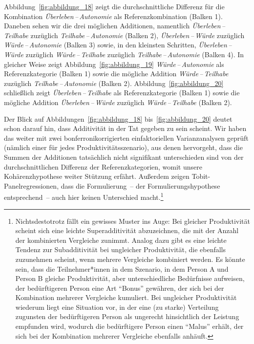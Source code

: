 \documentclass[justified,nobib,symmetric,twoside]{tufte-handout}
\begin{document}
Abbildung~\ref{fig:abbildung_18} zeigt die durchschnittliche Differenz für die Kombination \textit{Überleben\,--\,Autonomie} als Referenzkombination (Balken 1).
Daneben sehen wir die drei möglichen Additionen, namentlich \textit{Überleben\,--\,Teilhabe} zuzüglich \textit{Teilhabe\,--\,Autonomie} (Balken 2), \textit{Überleben\,--\,Würde} zuzüglich \textit{Würde\,--\,Autonomie} (Balken 3) sowie, in den kleinsten Schritten, \textit{Überleben\,--\,Würde} zuzüglich \textit{Würde\,--\,Teilhabe} zuzüglich \textit{Teilhabe\,--\,Autonomie} (Balken 4). In gleicher Weise zeigt Abbildung~\ref{fig:abbildung_19} \textit{Würde\,--\,Autonomie} als Referenzkategorie (Balken 1) sowie die mögliche Addition \textit{Würde\,--\,Teilhabe} zuzüglich \textit{Teilhabe\,--\,Autonomie} (Balken 2). Abbildung~\ref{fig:abbildung_20} schließlich zeigt \textit{Überleben\,--\,Teilhabe} als Referenzkategorie (Balken 1) sowie die mögliche Addition \textit{Überleben\,--\,Würde} zuzüglich \textit{Würde\,--\,Teilhabe} (Balken 2).

Der Blick auf Abbildungen~\ref{fig:abbildung_18} bis~\ref{fig:abbildung_20} deutet schon darauf hin, dass Additivität in der Tat gegeben zu sein scheint.
Wir haben das weiter mit zwei bonferronikorrigierten einfaktoriellen Varianzanalysen geprüft (nämlich einer für jedes Produktivitätsszenario), aus denen hervorgeht, dass die Summen der Additionen tatsächlich nicht signifikant unterschieden sind von der durchschnittlichen Differenz der Referenzkategorien, womit unsere Kohärenzhypothese weiter Stützung erfährt.
Außerdem zeigen Tobit-Panelregressionen, dass die Formulierung~-- der Formulierungshypothese entsprechend~-- auch hier keinen Unterschied macht.\footnote{Nichtsdestotrotz fällt ein gewisses Muster ins Auge: Bei gleicher Produktivität scheint sich eine leichte Superadditivität abzuzeichnen, die mit der Anzahl der kombinierten Vergleiche zunimmt. Analog dazu gibt es eine leichte Tendenz zur Subadditivität bei ungleicher Produktivität, die ebenfalls zuzunehmen scheint, wenn mehrere Vergleiche kombiniert werden. Es könnte sein, dass die Teilnehmer*innen in dem Szenario, in dem Person A und Person B gleiche Produktivität, aber unterschiedliche Bedürfnisse aufweisen, der bedürftigeren Person eine Art \enquote{Bonus} gewähren, der sich bei der Kombination mehrerer Vergleiche kumuliert. Bei ungleicher Produktivität wiederum liegt eine Situation vor, in der eine (zu starke) Verteilung zugunsten der bedürftigeren Person als ungerecht hinsichtlich der Leistung empfunden wird, wodurch die bedürftigere Person einen \enquote{Malus} erhält, der sich bei der Kombination mehrerer Vergleiche ebenfalls anhäuft.}
\end{document}
